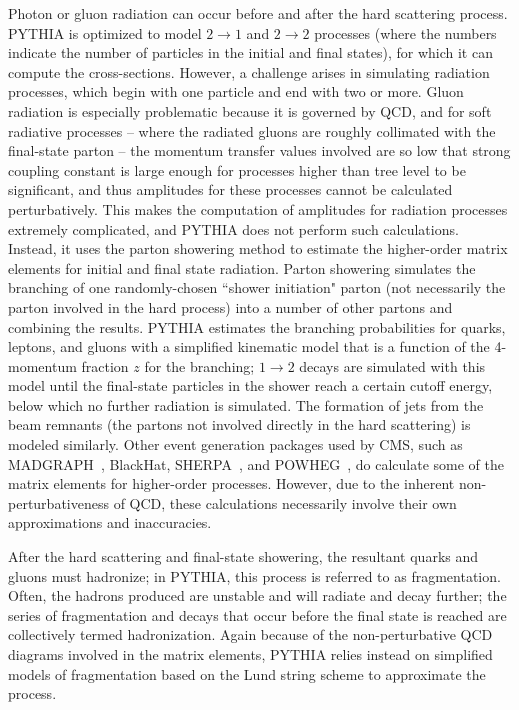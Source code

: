 Photon or gluon radiation can occur before and after the hard scattering process. PYTHIA is optimized to model $2 \rightarrow 1$ and $2 \rightarrow 2$ processes (where the numbers indicate the number of particles in the initial and final states), for which it can compute the cross-sections. However, a challenge arises in simulating radiation processes, which begin with one particle and end with two or more. Gluon radiation is especially problematic because it is governed by QCD, and for soft radiative processes -- where the radiated gluons are roughly collimated with the final-state parton -- the momentum transfer values involved are so low that strong coupling constant is large enough for processes higher than tree level to be significant, and thus amplitudes for these processes cannot be calculated perturbatively. This makes the computation of amplitudes for radiation processes extremely complicated, and PYTHIA does not perform such calculations. Instead, it uses the parton showering method to estimate the higher-order matrix elements for initial and final state radiation. Parton showering simulates the branching of one randomly-chosen ``shower initiation" parton (not necessarily the parton involved in the hard process) into a number of other partons and combining the results. PYTHIA estimates the branching probabilities for quarks, leptons, and gluons with a simplified kinematic model that is a function of the 4-momentum fraction $z$ for the branching; $1 \rightarrow 2$ decays are simulated with this model until the final-state particles in the shower reach a certain cutoff energy, below which no further radiation is simulated. The formation of jets from the beam remnants (the partons not involved directly in the hard scattering) is modeled similarly. Other event generation packages used by CMS, such as MADGRAPH~\cite{springerlink:10.1007/JHEP06(2011)128}, BlackHat, SHERPA~\cite{Berger:1177972}, and POWHEG~\cite{Alioli:2010ab}, do calculate some of the matrix elements for higher-order processes. However, due to the inherent non-perturbativeness of QCD, these calculations necessarily involve their own approximations and inaccuracies.

After the hard scattering and final-state showering, the resultant quarks and gluons must hadronize; in PYTHIA, this process is referred to as fragmentation. Often, the hadrons produced are unstable and will radiate and decay further; the series of fragmentation and decays that occur before the final state is reached are collectively termed hadronization. Again because of the non-perturbative QCD diagrams involved in the matrix elements, PYTHIA relies instead on simplified models of fragmentation based on the Lund string scheme to approximate the process.

